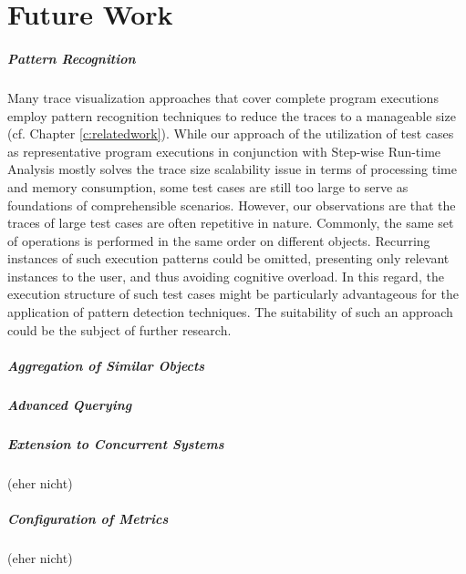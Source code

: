 \chapter{Future Work}
\label{c:futurework}

\paragraph{Pattern Recognition} Many trace visualization approaches that cover complete program executions employ pattern recognition techniques to reduce the traces to a manageable size (cf. Chapter \ref{c:relatedwork}).
While our approach of the utilization of test cases as representative program executions in conjunction with Step-wise Run-time Analysis mostly solves the trace size scalability issue in terms of processing time and memory consumption, some test cases are still too large to serve as foundations of comprehensible scenarios.
However, our observations are that the traces of large test cases are often repetitive in nature. Commonly, the same set of operations is performed in the same order on different objects.
Recurring instances of such execution patterns could be omitted, presenting only relevant instances to the user, and thus avoiding cognitive overload.
In this regard, the execution structure of such test cases might be particularly advantageous for the application of pattern detection techniques.
The suitability of such an approach could be the subject of further research.

\paragraph{Aggregation of Similar Objects}

\paragraph{Advanced Querying}

\paragraph{Extension to Concurrent Systems} (eher nicht)

\paragraph{Configuration of Metrics} (eher nicht)